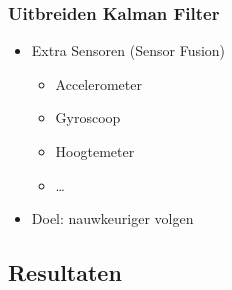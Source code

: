\documentclass{beamer}
\begin{document}
  \begin{frame}
    \frametitle{Uitbreiden Kalman Filter}
    \begin{itemize}
      \item Extra Sensoren (Sensor Fusion)
        \begin{itemize}
          \item Accelerometer
          \item Gyroscoop
          \item Hoogtemeter
          \item \ldots
        \end{itemize}
      \item Doel: nauwkeuriger volgen
    \end{itemize}
  \end{frame}
\subsection{Resultaten}
\end{document}

